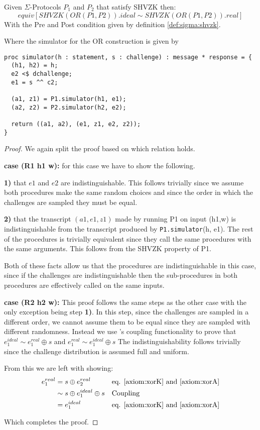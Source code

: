 \begin{lemma}[OR SHVZK]
  Given $\Sigma$-Protocols $P_{1}$ and $P_{2}$ that satisfy SHVZK then:
  \[
    equiv[SHVZK(OR(P1, P2)).ideal \sim SHVZK(OR(P1, P2)).real]
  \]
  With the Pre and Post condition given by definition \ref{def:sigma:shvzk}.

  Where the simulator for the OR construction is given by

\begin{lstlisting}
proc simulator(h : statement, s : challenge) : message * response = {
  (h1, h2) = h;
  e2 <$ dchallenge;
  e1 = s ^^ c2;

  (a1, z1) = P1.simulator(h1, e1);
  (a2, z2) = P2.simulator(h2, e2);

  return ((a1, a2), (e1, z1, e2, z2));
}
\end{lstlisting}
\end{lemma}
\begin{proof}
  We again split the proof based on which relation holds.

  \noindent\textbf{case (R1 h1 w): } for this case we have to show the following.

  \noindent\textbf{1)} that $e1$ and $e2$ are indistinguishable. This follows
  trivially since we assume both procedures make the same random choices and
  since the order in which the challenges are sampled they must be equal.

  \noindent\textbf{2)} that the transcript $(a1, e1, z1)$ made by running P1 on
  input (h1,w) is indistinguishable from the transcript produced by
  \texttt{P1.simulator}(h, e1). The rest of the procedures is trivially
  equivalent since they call the same procedures with the same arguments.
  This follows from the SHVZK property of P1.

  Both of these facts allow us that the procedures are indistinguishable in this
  case, since if the challenges are indistinguishable then the sub-procedures in
  both procedures are effectively called on the same inputs.

  \noindent\textbf{case (R2 h2 w): } This proof follows the same steps as the
  other case with the only exception being step \textbf{1)}. In this step, since
  the challenges are sampled in a different order, we cannot assume them to be
  equal since they are sampled with different randomness. Instead we use
  \easycrypt's coupling functionality to prove that
  $e_{1}^{ideal} \sim e_{1}^{real} \oplus s$ and
  $e_{1}^{real} \sim e_{1}^{ideal} \oplus s$
  The indistinguishability follows trivially since the challenge distribution is
  assumed full and uniform.

  From this we are left with showing:
  \begin{align*}
    e_{1}^{real} &= s \oplus e_{2}^{real} && \text{eq. \ref{axiom:xorK} and \ref{axiom:xorA}} \\
                &\sim s \oplus e_{1}^{ideal} \oplus s && \text{Coupling} \\
                &= e_{1}^{ideal} && \text{eq. \ref{axiom:xorK} and \ref{axiom:xorA}}
  \end{align*}

  Which completes the proof.
\end{proof}

